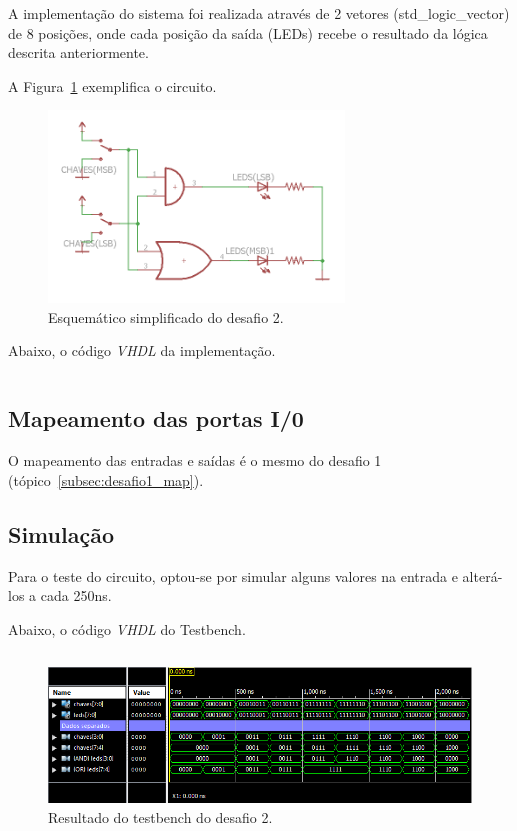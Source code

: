 \documentclass[12pt]{article}
\begin{document}
A implementação do sistema foi realizada através de 2 vetores (std\_logic\_vector) de 8 posições, onde cada posição da saída (LEDs) recebe o resultado da lógica descrita anteriormente.

A Figura~\ref{fig:desafio2_sch} exemplifica o circuito.

\begin{figure}[!h]
    \centering
    \includegraphics[width=0.7\textwidth]{desafio2_sch.png}
    \caption{Esquemático simplificado do desafio 2.}
    \label{fig:desafio2_sch}
\end{figure}


Abaixo, o código \emph{VHDL} da implementação.

\inputminted{vhdl}{Desafio2.vhd}

\subsection{Mapeamento das portas I/0}

O mapeamento das entradas e saídas é o mesmo do desafio 1 (tópico~\ref{subsec:desafio1_map}).

\subsection{Simulação}

Para o teste do circuito, optou-se por simular alguns valores na entrada e alterá-los a cada 250ns.

Abaixo, o código \emph{VHDL} do Testbench.

\inputminted{vhdl}{tb_desafio2.vhd}

\begin{figure}[!h]
    \centering
    \includegraphics[width=1\textwidth]{tb_2.PNG}
    \caption{Resultado do testbench do desafio 2.}
    \label{fig:desafio2}
\end{figure}
\end{document}
